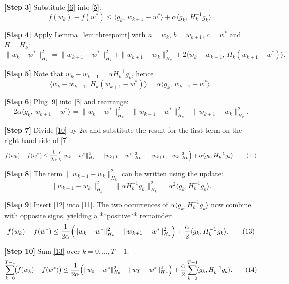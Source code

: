 \documentclass{article}
\begin{document}
\noindent\textbf{[Step 3]}  Substitute \eqref{6} into \eqref{5}:
\[
f(w_{k})-f(w^{*})
   \le\langle g_{k},\,w_{k+1}-w^{*}\rangle
      +\alpha\langle g_{k},\,H_{k}^{-1}g_{k}\rangle .
\tag{7}
\]

\noindent\textbf{[Step 4]}  Apply Lemma~\ref{lem:threepoint} with $a=w_{k}$, $b=w_{k+1}$, $c=w^{*}$ and $H=H_{k}$:
\[
\|w_{k}-w^{*}\|_{H_{k}}^{2}
   =\|w_{k+1}-w^{*}\|_{H_{k}}^{2}
     +\|w_{k+1}-w_{k}\|_{H_{k}}^{2}
     +2\langle w_{k}-w_{k+1},\,H_{k}(w_{k+1}-w^{*})\rangle .
\tag{8}
\]

\noindent\textbf{[Step 5]}  Note that $w_{k}-w_{k+1}= \alpha H_{k}^{-1}g_{k}$, hence
\[
\langle w_{k}-w_{k+1},\,H_{k}(w_{k+1}-w^{*})\rangle
   =\alpha\langle g_{k},\,w_{k+1}-w^{*}\rangle .
\tag{9}
\]

\noindent\textbf{[Step 6]}  Plug \eqref{9} into \eqref{8} and rearrange:
\[
2\alpha\langle g_{k},\,w_{k+1}-w^{*}\rangle
   =\|w_{k}-w^{*}\|_{H_{k}}^{2}
    -\|w_{k+1}-w^{*}\|_{H_{k}}^{2}
    -\|w_{k+1}-w_{k}\|_{H_{k}}^{2}.
\tag{10}
\]

\noindent\textbf{[Step 7]}  Divide \eqref{10} by $2\alpha$ and substitute the result for the first term on the right‑hand side of \eqref{7}:
\[
f(w_{k})-f(w^{*})
   \le\frac{1}{2\alpha}\Bigl(
        \|w_{k}-w^{*}\|_{H_{k}}^{2}
       -\|w_{k+1}-w^{*}\|_{H_{k}}^{2}
       -\|w_{k+1}-w_{k}\|_{H_{k}}^{2}
        \Bigr)
      +\alpha\langle g_{k},H_{k}^{-1}g_{k}\rangle .
\tag{11}
\]

\noindent\textbf{[Step 8]}  The term $\|w_{k+1}-w_{k}\|_{H_{k}}^{2}$ can be written using the update:
\[
\|w_{k+1}-w_{k}\|_{H_{k}}^{2}
   =\|\alpha H_{k}^{-1}g_{k}\|_{H_{k}}^{2}
   =\alpha^{2}\langle g_{k},H_{k}^{-1}g_{k}\rangle .
\tag{12}
\]

\noindent\textbf{[Step 9]}  Insert \eqref{12} into \eqref{11}.  The two occurrences of 
$\alpha\langle g_{k},H_{k}^{-1}g_{k}\rangle$ now combine with opposite signs, yielding a **positive** remainder:
\[
f(w_{k})-f(w^{*})
   \le\frac{1}{2\alpha}
        \Bigl(
          \|w_{k}-w^{*}\|_{H_{k}}^{2}
         -\|w_{k+1}-w^{*}\|_{H_{k}}^{2}
        \Bigr)
      +\frac{\alpha}{2}\langle g_{k},H_{k}^{-1}g_{k}\rangle .
\tag{13}
\]

\noindent\textbf{[Step 10]}  Sum \eqref{13} over $k=0,\dots,T-1$:
\[
\sum_{k=0}^{T-1}\!\bigl(f(w_{k})-f(w^{*})\bigr)
   \le\frac{1}{2\alpha}
        \Bigl(
          \|w_{0}-w^{*}\|_{H_{0}}^{2}
         -\|w_{T}-w^{*}\|_{H_{T}}^{2}
        \Bigr)
      +\frac{\alpha}{2}\sum_{k=0}^{T-1}\!\langle g_{k},H_{k}^{-1}g_{k}\rangle .
\tag{14}
\]
\end{document}
